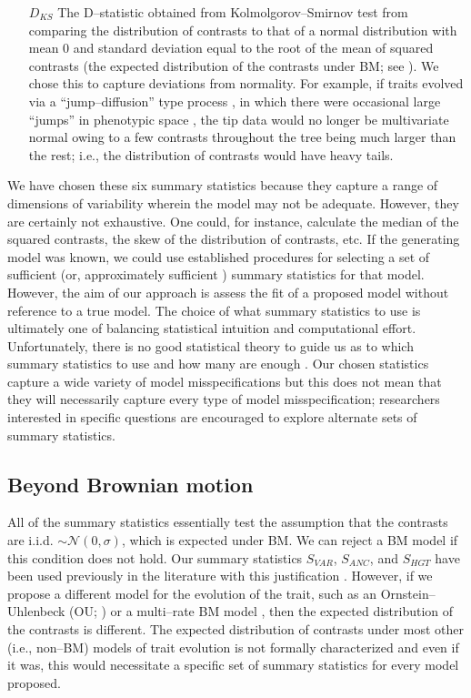 \documentclass[a4paper,12pt]{article}
\begin{document}
\begin{enumerate}
\item[$D_{KS}$] The D--statistic obtained from Kolmolgorov--Smirnov test from comparing the distribution of contrasts to that of a normal distribution with mean 0 and standard deviation equal to the root of the mean of squared contrasts (the expected distribution of the contrasts under BM; see \citep{Felsenstein1985, Rohlf2001}). We chose this to capture deviations from normality. For example, if traits evolved via a ``jump--diffusion'' type process \citep{Landis2012}, in which there were occasional large ``jumps'' in phenotypic space \citep{PennellPE}, the tip data would no longer be multivariate normal owing to a few contrasts throughout the tree being much larger than the rest; i.e., the distribution of contrasts would have heavy tails. 

\end{enumerate}

We have chosen these six summary statistics because they capture a range of dimensions of variability wherein the model may not be adequate. However, they are certainly not exhaustive. One could, for instance, calculate the median of the squared contrasts, the skew of the distribution of contrasts, etc. If the generating model was known, we could use established procedures for selecting a set of sufficient (or, approximately sufficient \citep{MajoramJoyce}) summary statistics for that model. However, the aim of our approach is assess the fit of a proposed model without reference to a true model. The choice of what summary statistics to use is ultimately one of balancing statistical intuition and computational effort. Unfortunately, there is no good statistical theory to guide us as to which summary statistics to use and how many are enough \citep{Gelmanbook}. Our chosen statistics capture a wide variety of model misspecifications but this does not mean that they will necessarily capture every type of model misspecification; researchers interested in specific questions are encouraged to explore alternate sets of summary statistics. 

\subsection*{Beyond Brownian motion}

All of the summary statistics essentially test the assumption that the contrasts are i.i.d. $\sim\mathcal{N}(0, \sigma)$, which is expected under BM. We can reject a BM model if this condition does not hold. Our summary statistics $S_{VAR}$, $S_{ANC}$, and $S_{HGT}$ have been used previously in the literature with this justification \citep{Garland1992, Garland1993,  Diaz1996}. However, if we propose a different model for the evolution of the trait, such as an Ornstein--Uhlenbeck (OU; \citep{Hansen1997}) or a multi--rate BM model \citep{Omeara2006}, then the expected distribution of the contrasts is different. The expected distribution of contrasts under most other (i.e., non--BM) models of trait evolution is not formally characterized and even if it was, this would necessitate a specific set of summary statistics for every model proposed.
\end{document}
